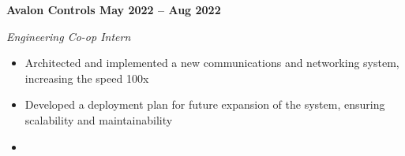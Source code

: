\vspace{0.1cm}
\textbf{Avalon Controls \hfill May 2022 -- Aug 2022} \par
\textit{Engineering Co-op Intern} \par
\begin{itemize}
	\item Architected and implemented a new communications and networking system, increasing the speed 100x 
  \item Developed a deployment plan for future expansion of the system, ensuring scalability and maintainability
  \item 
\end{itemize} \par